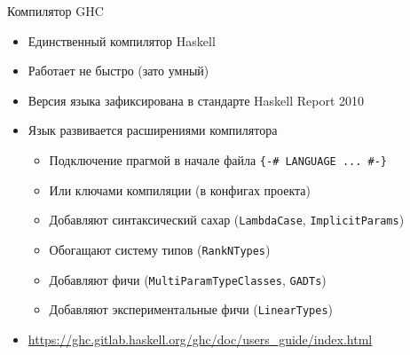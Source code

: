 
    \begin{frame}{Компилятор GHC}
        \begin{itemize}
            \item Единственный компилятор Haskell
            \item Работает не быстро (зато умный)
            \item Версия языка зафиксирована в стандарте Haskell Report 2010
            \item Язык развивается расширениями компилятора
            \begin{itemize}
                \item Подключение прагмой в начале файла \texttt{\{-\# LANGUAGE ... \#-\}}
                \item Или ключами компиляции (в конфигах проекта)
                \item Добавляют синтаксический сахар (\texttt{LambdaCase}, \texttt{ImplicitParams})
                \item Обогащают систему типов (\texttt{RankNTypes})
                \item Добавляют фичи (\texttt{MultiParamTypeClasses}, \texttt{GADTs})
                \item Добавляют экспериментальные фичи (\texttt{LinearTypes})
            \end{itemize}
            \item \href{https://ghc.gitlab.haskell.org/ghc/doc/users_guide/index.html}{\color{blue} https://ghc.gitlab.haskell.org/ghc/doc/users\_guide/index.html}
        \end{itemize}
    \end{frame}

